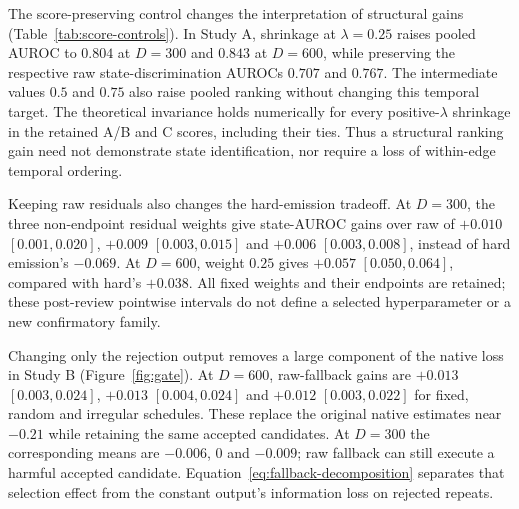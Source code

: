 The score-preserving control changes the interpretation of structural gains
(Table~\ref{tab:score-controls}). In Study A, shrinkage at $\lambda=0.25$ raises
pooled AUROC to $0.804$ at $D=300$ and $0.843$ at $D=600$, while preserving
the respective raw state-discrimination AUROCs $0.707$ and $0.767$.
The intermediate values $0.5$ and $0.75$ also raise pooled ranking without
changing this temporal target. The theoretical invariance holds numerically
for every positive-$\lambda$ shrinkage in the retained A/B and C scores,
including their ties. Thus a structural ranking gain need not demonstrate
state identification, nor require a loss of within-edge temporal ordering.

Keeping raw residuals also changes the hard-emission tradeoff. At $D=300$,
the three non-endpoint residual weights give state-AUROC gains over raw of
$+0.010$ $[0.001,0.020]$, $+0.009$ $[0.003,0.015]$ and
$+0.006$ $[0.003,0.008]$, instead of hard emission's $-0.069$.
At $D=600$, weight $0.25$ gives $+0.057$ $[0.050,0.064]$,
compared with hard's $+0.038$. All fixed weights and their endpoints are
retained; these post-review pointwise intervals do not define a selected
hyperparameter or a new confirmatory family.

Changing only the rejection output removes a large component of the native
loss in Study B (Figure~\ref{fig:gate}). At $D=600$, raw-fallback gains are
$+0.013$ $[0.003,0.024]$, $+0.013$ $[0.004,0.024]$ and
$+0.012$ $[0.003,0.022]$ for fixed, random and irregular schedules.
These replace the original native estimates near $-0.21$ while retaining the
same accepted candidates. At $D=300$ the corresponding means are
$-0.006$, $0$ and $-0.009$; raw fallback can still execute a harmful accepted
candidate. Equation~\eqref{eq:fallback-decomposition} separates that selection
effect from the constant output's information loss on rejected repeats.
